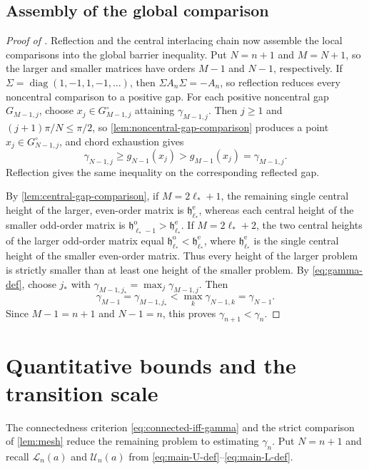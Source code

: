 \documentclass[10pt,twoside]{siamart1116}
\numberwithin{equation}{section}
\DeclareMathOperator{\diag}{diag}
\begin{document}
\subsection{Assembly of the global comparison}
\label{subsec:global-comparison}

\begin{proof}[Proof of ]
Reflection and the central interlacing chain now assemble the local
comparisons into the global barrier inequality.  Put \(N=n+1\) and
\(M=N+1\), so the
larger and smaller matrices have orders \(M-1\) and \(N-1\), respectively.  If
\(\Sigma=\diag(1,-1,1,-1,\ldots)\), then
\(\Sigma A_n\Sigma=-A_n\), so reflection reduces every noncentral
comparison to a positive gap.  For each positive noncentral gap
\(G_{M-1,j}\), choose
\(x_j\in G_{M-1,j}^{\circ}\) attaining \(\gamma_{M-1,j}\).  Then
\(j\geq1\) and \((j+1)\pi/N\leq\pi/2\), so
\cref{lem:noncentral-gap-comparison} produces a point
\(\widehat x_j\in G_{N-1,j}^{\circ}\), and chord exhaustion gives
\[
 \gamma_{N-1,j}\geq g_{N-1}(\widehat x_j)
 >g_{M-1}(x_j)=\gamma_{M-1,j}.
\]
Reflection gives the same inequality on the corresponding reflected gap.

By \cref{lem:central-gap-comparison}, if \(M=2\ell_*+1\), the remaining
single central height of the larger, even-order matrix is
\(\mathfrak h_{\ell_*}^{\mathrm e}\),
whereas each central height of the
smaller odd-order matrix is
\(\mathfrak h_{\ell_*-1}^{\mathrm o}>\mathfrak h_{\ell_*}^{\mathrm e}\).  If
\(M=2\ell_*+2\), the two central heights of the larger odd-order matrix
equal
\(\mathfrak h_{\ell_*}^{\mathrm o}<\mathfrak h_{\ell_*}^{\mathrm e}\),
where \(\mathfrak h_{\ell_*}^{\mathrm e}\) is the single
central height of the smaller even-order matrix.
Thus every height of the larger problem is strictly smaller than at
least one height of the smaller problem.  By \eqref{eq:gamma-def}, choose
\(j_*\) with
\(\gamma_{M-1,j_*}=\max_j\gamma_{M-1,j}\).  Then
\[
 \gamma_{M-1}=\gamma_{M-1,j_*}
 <\max_k\gamma_{N-1,k}=\gamma_{N-1}.
\]
Since \(M-1=n+1\) and \(N-1=n\), this proves
\(\gamma_{n+1}<\gamma_n\).
\end{proof}

\section{Quantitative bounds and the transition scale}
\label{sec:topology-bounds}

The connectedness criterion \eqref{eq:connected-iff-gamma} and the strict
comparison of \cref{lem:mesh} reduce the remaining problem to estimating
\(\gamma_n\).  Put \(N=n+1\) and recall \(\mathcal L_n(a)\) and
\(\mathcal U_n(a)\) from
\eqref{eq:main-U-def}--\eqref{eq:main-L-def}.
\end{document}
